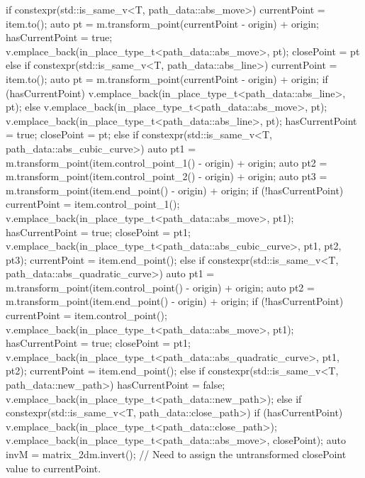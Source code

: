 \begin{codeblock}
{{      if constexpr(std::is_same_v<T, path_data::abs_move>) {
        currentPoint = item.to();
        auto pt = m.transform_point(currentPoint - origin) + origin;
        hasCurrentPoint = true;
        v.emplace_back(in_place_type_t<path_data::abs_move>, pt);
        closePoint = pt
      }
      else if constexpr(std::is_same_v<T, path_data::abs_line>) {
        currentPoint = item.to();
        auto pt = m.transform_point(currentPoint - origin) + origin;
        if (hasCurrentPoint) {
          v.emplace_back(in_place_type_t<path_data::abs_line>, pt);
        }
        else {
          v.emplace_back(in_place_type_t<path_data::abs_move>, pt);
          v.emplace_back(in_place_type_t<path_data::abs_line>, pt);
          hasCurrentPoint = true;
          closePoint = pt;
        }
      }
      else if constexpr(std::is_same_v<T, path_data::abs_cubic_curve>) {
        auto pt1 = m.transform_point(item.control_point_1() - origin) + origin;
        auto pt2 = m.transform_point(item.control_point_2() - origin) + origin;
        auto pt3 = m.transform_point(item.end_point() - origin) + origin;
        if (!hasCurrentPoint) {
          currentPoint = item.control_point_1();
          v.emplace_back(in_place_type_t<path_data::abs_move>, pt1);
          hasCurrentPoint = true;
          closePoint = pt1;
        }
        v.emplace_back(in_place_type_t<path_data::abs_cubic_curve>, pt1,
          pt2, pt3);
        currentPoint = item.end_point();
      }
      else if constexpr(std::is_same_v<T,
        path_data::abs_quadratic_curve>) {
      	auto pt1 = m.transform_point(item.control_point() - origin) + origin;
      	auto pt2 = m.transform_point(item.end_point() - origin) + origin;
      	if (!hasCurrentPoint) {
      		currentPoint = item.control_point();
      		v.emplace_back(in_place_type_t<path_data::abs_move>, pt1);
      		hasCurrentPoint = true;
      		closePoint = pt1;
      	}
      	v.emplace_back(in_place_type_t<path_data::abs_quadratic_curve>,
      	  pt1, pt2);
      	currentPoint = item.end_point();
      }
      else if constexpr(std::is_same_v<T, path_data::new_path>) {
        hasCurrentPoint = false;
        v.emplace_back(in_place_type_t<path_data::new_path>);
      }
      else if constexpr(std::is_same_v<T, path_data::close_path>) {
        if (hasCurrentPoint) {
          v.emplace_back(in_place_type_t<path_data::close_path>);
          v.emplace_back(in_place_type_t<path_data::abs_move>,
            closePoint);
          auto invM = matrix_2d{m}.invert();
          // Need to assign the untransformed closePoint value to currentPoint.
}}}}
\end{codeblock}
